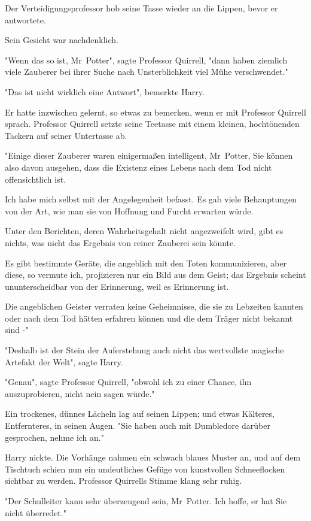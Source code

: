 {Der Verteidigungsprofessor hob seine Tasse wieder an die Lippen, bevor er antwortete.

Sein Gesicht war nachdenklich.

"Wenn das so ist, Mr~Potter", sagte Professor Quirrell, "dann haben ziemlich viele Zauberer bei ihrer Suche nach Unsterblichkeit viel Mühe verschwendet."

"Das ist nicht wirklich eine Antwort", bemerkte Harry.

Er hatte inzwischen gelernt, so etwas zu bemerken, wenn er mit Professor Quirrell sprach. Professor Quirrell setzte seine Teetasse mit einem kleinen, hochtönenden Tackern auf seiner Untertasse ab.

"Einige dieser Zauberer waren einigermaßen intelligent, Mr~Potter, Sie können also davon ausgehen, dass die Existenz eines Lebens nach dem Tod nicht offensichtlich ist.

Ich habe mich selbst mit der Angelegenheit befasst. Es gab viele Behauptungen von der Art, wie man sie von Hoffnung und Furcht erwarten würde.

Unter den Berichten, deren Wahrheitsgehalt nicht angezweifelt wird, gibt es nichts, was nicht das Ergebnis von reiner Zauberei sein könnte.

Es gibt bestimmte Geräte, die angeblich mit den Toten kommunizieren, aber diese, so vermute ich, projizieren nur ein Bild aus dem Geist; das Ergebnis scheint ununterscheidbar von der Erinnerung, weil es Erinnerung ist.

Die angeblichen Geister verraten keine Geheimnisse, die sie zu Lebzeiten kannten oder nach dem Tod hätten erfahren können und die dem Träger nicht bekannt sind -"

"Deshalb ist der Stein der Auferstehung auch nicht das wertvollste magische Artefakt der Welt", sagte Harry.

"Genau", sagte Professor Quirrell, "obwohl ich zu einer Chance, ihn auszuprobieren, nicht nein sagen würde."

Ein trockenes, dünnes Lächeln lag auf seinen Lippen; und etwas Kälteres, Entfernteres, in seinen Augen. "Sie haben auch mit Dumbledore darüber gesprochen, nehme ich an."

Harry nickte. Die Vorhänge nahmen ein schwach blaues Muster an, und auf dem Tischtuch schien nun ein undeutliches Gefüge von kunstvollen Schneeflocken sichtbar zu werden. Professor Quirrells Stimme klang sehr ruhig.

"Der Schulleiter kann sehr überzeugend sein, Mr~Potter. Ich hoffe, er hat Sie nicht überredet."

}
